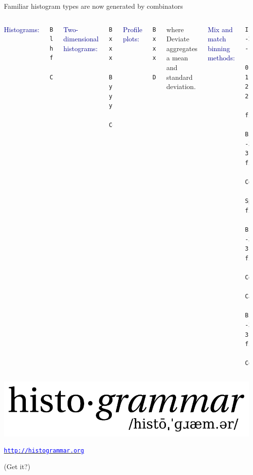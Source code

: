 \documentclass[aspectratio=169]{beamer}
\begin{document}
\begin{frame}[fragile]{Familiar histogram types are now generated by combinators}
\vspace{0.5 cm}
\begin{columns}
\small
\textcolor{darkblue}{\normalsize Histograms:}
\begin{verbatim}
Bin(num, low, high, fillRule,
  Count())
\end{verbatim}

\vspace{0.25 cm}
\textcolor{darkblue}{\normalsize Two-dimensional histograms:}
\begin{verbatim}
Bin(xnum, xlow, xhigh, xfill,
  Bin(ynum, ylow, yhigh, yfill,
    Count()))
\end{verbatim}

\vspace{0.25 cm}
\textcolor{darkblue}{\normalsize Profile plots:}
\begin{verbatim}
Bin(xnum, xlow, xhigh, xfill,
  Deviate(yfill))
\end{verbatim}

{\normalsize where {\ttfamily\small Deviate} aggregates a mean and standard deviation.}

\small
\textcolor{darkblue}{\normalsize Mix and match binning methods:}
\begin{verbatim}
IrregularlyBin([-2.4, -2.1, -1.5,
    0.0, 1.5, 2.1, 2.4],
  filleta,
  Bin(314, -3.14, 3.14, fillphi,
    Count()))

SparselyBin(0.01, filleta,
  Bin(314, -3.14, 3.14, fillphi,
    Count()))

Categorize(fillByName,
  Bin(314, -3.14, 3.14, fillphi,
    Count()))
\end{verbatim}
\end{columns}
\end{frame}

\begin{frame}{}
\vspace{1.5 cm}
\begin{center}
\includegraphics[width=0.6\linewidth]{histogrammar-logo-paths.pdf}

\vspace{0.5 cm}
\Large \href{http://histogrammar.org}{\textcolor{blue}{\tt http://histogrammar.org}}
\end{center}

\vspace{1.5 cm}
\textcolor{mauve}{\LARGE (Get it?)}
\end{frame}
\end{document}
